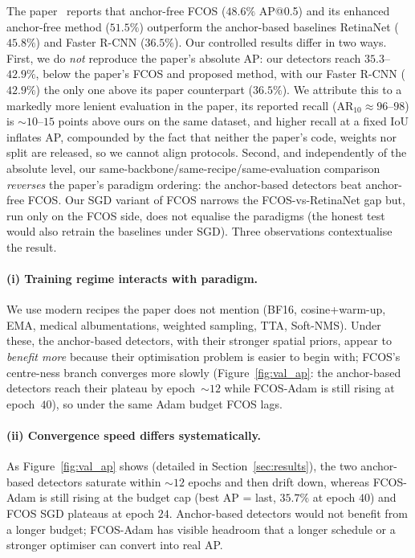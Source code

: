 \documentclass[11pt,a4paper]{article}
\begin{document}
The paper~\cite{wu2024pneumonia} reports that anchor-free FCOS ($48.6\%$ AP@0.5) and its enhanced anchor-free method ($51.5\%$) outperform the anchor-based baselines RetinaNet ($45.8\%$) and Faster R-CNN ($36.5\%$). Our controlled results differ in two ways. First, we do \emph{not} reproduce the paper's absolute AP: our detectors reach $35.3$--$42.9\%$, below the paper's FCOS and proposed method, with our Faster R-CNN ($42.9\%$) the only one above its paper counterpart ($36.5\%$). We attribute this to a markedly more lenient evaluation in the paper, its reported recall ($\mathrm{AR}_{10}\approx 96$--$98$) is $\sim 10$--$15$ points above ours on the same dataset, and higher recall at a fixed IoU inflates AP, compounded by the fact that neither the paper's code, weights nor split are released, so we cannot align protocols. Second, and independently of the absolute level, our same-backbone/same-recipe/same-evaluation comparison \emph{reverses} the paper's paradigm ordering: the anchor-based detectors beat anchor-free FCOS. Our SGD variant of FCOS narrows the FCOS-vs-RetinaNet gap but, run only on the FCOS side, does not equalise the paradigms (the honest test would also retrain the baselines under SGD). Three observations contextualise the result.

\paragraph{(i) Training regime interacts with paradigm.}
We use modern recipes the paper does not mention (BF16, cosine+warm-up, EMA, medical albumentations, weighted sampling, TTA, Soft-NMS). Under these, the anchor-based detectors, with their stronger spatial priors, appear to \emph{benefit more} because their optimisation problem is easier to begin with; FCOS's centre-ness branch converges more slowly (Figure~\ref{fig:val_ap}: the anchor-based detectors reach their plateau by epoch~$\sim\!12$ while FCOS-Adam is still rising at epoch~$40$), so under the same Adam budget FCOS lags.

\paragraph{(ii) Convergence speed differs systematically.}
As Figure~\ref{fig:val_ap} shows (detailed in Section~\ref{sec:results}), the two anchor-based detectors saturate within $\sim 12$ epochs and then drift down, whereas FCOS-Adam is still rising at the budget cap (best AP = last, $35.7\%$ at epoch $40$) and FCOS SGD plateaus at epoch $24$. Anchor-based detectors would not benefit from a longer budget; FCOS-Adam has visible headroom that a longer schedule or a stronger optimiser can convert into real AP.
\end{document}
